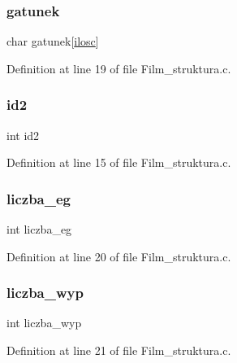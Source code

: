 \subsubsection{\texorpdfstring{gatunek}{gatunek}}
{\footnotesize\ttfamily char gatunek\mbox{[}\hyperlink{_wypozyczenie__struktura_8c_a802c84452854799df868a4a660d3d58a}{ilosc}\mbox{]}}



Definition at line 19 of file Film\+\_\+struktura.\+c.

\mbox{\label{struct_f_i_l_m_abff687cb542be70b85afa82d0c3496d0}} 
\subsubsection{\texorpdfstring{id2}{id2}}
{\footnotesize\ttfamily int id2}



Definition at line 15 of file Film\+\_\+struktura.\+c.

\mbox{\label{struct_f_i_l_m_a9782bbc38aea3fffcf052c96587b387c}} 
\subsubsection{\texorpdfstring{liczba\+\_\+eg}{liczba\_eg}}
{\footnotesize\ttfamily int liczba\+\_\+eg}



Definition at line 20 of file Film\+\_\+struktura.\+c.

\mbox{\label{struct_f_i_l_m_a5885662d45b08335111e160dbafd0085}} 
\subsubsection{\texorpdfstring{liczba\+\_\+wyp}{liczba\_wyp}}
{\footnotesize\ttfamily int liczba\+\_\+wyp}



Definition at line 21 of file Film\+\_\+struktura.\+c.

\mbox{\label{struct_f_i_l_m_a4c4d7d17d408c571231b093758ae0775}} 
